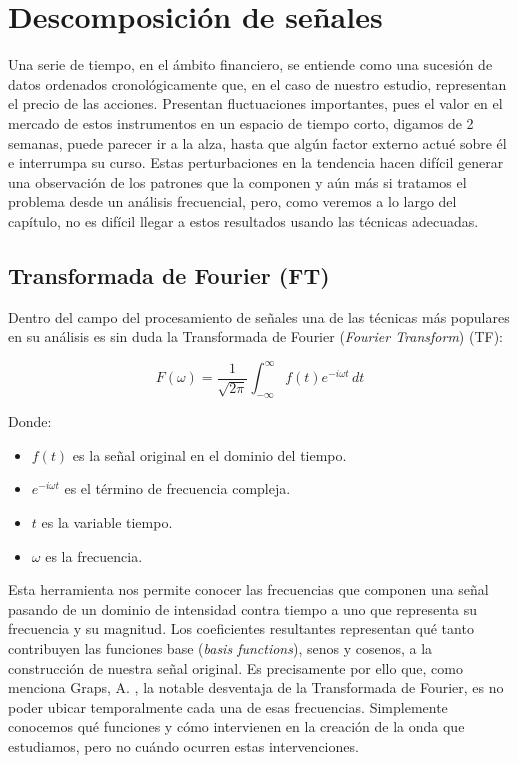 \chapter{Descomposición de señales} %
\label{cap:desc} 


Una serie de tiempo, en el ámbito financiero, se entiende como una sucesión de datos ordenados cronológicamente que, en el caso de nuestro estudio, representan el precio de las acciones. Presentan fluctuaciones importantes, pues el valor en el mercado de estos instrumentos en un espacio de tiempo corto, digamos de 2 semanas, puede parecer ir a la alza, hasta que algún factor externo actué sobre él e interrumpa su curso. Estas perturbaciones en la tendencia hacen difícil generar una observación de los patrones que la componen y aún más si tratamos el problema desde un análisis frecuencial, pero, como veremos a lo largo del capítulo, no es difícil llegar a estos resultados usando las técnicas adecuadas.

\section{Transformada de Fourier (FT)}

Dentro del campo del procesamiento de señales una de las técnicas más populares en su análisis es sin duda la Transformada de Fourier (\textit{Fourier Transform}) (TF):

$$
F(\omega) = \frac{1}{\sqrt{2\pi}}\int_{-\infty}^{\infty} f(t) e^{-i\omega t} \, dt
$$

Donde:

\begin{itemize}
  \item \( f(t) \) es la señal original en el dominio del tiempo.
  \item \( e^{-i\omega t} \) es el término de frecuencia compleja.
  \item \( t \) es la variable tiempo.
  \item \( \omega \) es la frecuencia.
\end{itemize}

 Esta herramienta nos permite conocer las frecuencias que componen una señal %
pasando de un dominio de intensidad contra tiempo a uno que representa su frecuencia y su magnitud. Los coeficientes resultantes representan qué tanto contribuyen las funciones base (\textit{basis functions}), senos y cosenos, a la construcción de nuestra señal original. Es precisamente por ello que, como menciona Graps, A. \citep{an_introduction_to_wavelets}, la notable desventaja de la Transformada de Fourier, es no poder ubicar temporalmente cada una de esas frecuencias. Simplemente conocemos qué funciones y cómo intervienen en la creación de la onda que estudiamos, pero no cuándo ocurren estas intervenciones.

